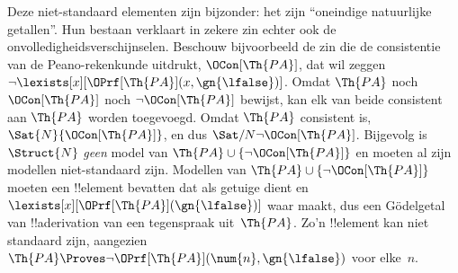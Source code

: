\documentclass[../../../include/open-logic-section]{subfiles}
\begin{document}
Deze niet-standaard elementen zijn bijzonder: het zijn ``oneindige
natuurlijke getallen''. Hun bestaan verklaart in zekere zin echter ook de
onvolledigheidsverschijnselen. Beschouw bijvoorbeeld de zin die de
consistentie van de Peano-rekenkunde uitdrukt, $\OCon[\Th{PA}]$, dat wil
zeggen $\lnot
\lexists[x][\OPrf[\Th{PA}](x, \gn{\lfalse})]$. Omdat $\Th{PA}$ noch
$\OCon[\Th{PA}]$ noch $\lnot \OCon[\Th{PA}]$ bewijst, kan elk van beide
consistent aan $\Th{PA}$ worden toegevoegd. Omdat $\Th{PA}$ consistent is,
$\Sat{N}{\OCon[\Th{PA}]}$, en dus $\Sat/{N}{\lnot
  \OCon[\Th{PA}]}$. Bijgevolg is $\Struct{N}$ \emph{geen} model van
$\Th{PA} \cup \{\lnot \OCon[\Th{PA}]\}$ en moeten al zijn modellen
niet-standaard zijn. Modellen van $\Th{PA} \cup \{\lnot
\OCon[\Th{PA}]\}$ moeten een !!{element} bevatten dat als getuige dient en
$\lexists[x][\OPrf[\Th{PA}](\gn{\lfalse})]$ waar maakt, dus een G\"odelgetal
van !!a{derivation} van een tegenspraak uit~$\Th{PA}$. Zo'n !!{element}
kan niet standaard zijn, aangezien $\Th{PA} \Proves \lnot
\OPrf[\Th{PA}](\num{n}, \gn{\lfalse})$ voor elke~$n$.
\end{document}
